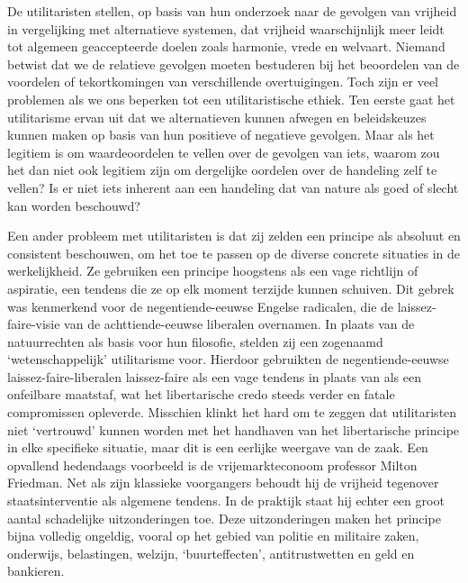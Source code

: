 \documentclass[
  a5paper,
  smalldemyvopaper,10pt,twoside,onecolumn,openright,extrafontsizes,hidelinks]{memoir}
\begin{document}
De utilitaristen stellen, op basis van hun onderzoek naar de gevolgen
van vrijheid in vergelijking met alternatieve systemen, dat vrijheid
waarschijnlijk meer leidt tot algemeen geaccepteerde doelen zoals
harmonie, vrede en welvaart. Niemand betwist dat we de relatieve
gevolgen moeten bestuderen bij het beoordelen van de voordelen of
tekortkomingen van verschillende overtuigingen. Toch zijn er veel
problemen als we ons beperken tot een utilitaristische ethiek. Ten
eerste gaat het utilitarisme ervan uit dat we alternatieven kunnen
afwegen en beleidskeuzes kunnen maken op basis van hun positieve of
negatieve gevolgen. Maar als het legitiem is om waardeoordelen te vellen
over de gevolgen van iets, waarom zou het dan niet ook legitiem zijn om
dergelijke oordelen over de handeling zelf te vellen? Is er niet iets
inherent aan een handeling dat van nature als goed of slecht kan worden
beschouwd?

Een ander probleem met utilitaristen is dat zij zelden een principe als
absoluut en consistent beschouwen, om het toe te passen op de diverse
concrete situaties in de werkelijkheid. Ze gebruiken een principe
hoogstens als een vage richtlijn of aspiratie, een tendens die ze op elk
moment terzijde kunnen schuiven. Dit gebrek was kenmerkend voor de
negentiende-eeuwse Engelse radicalen, die de laissez-faire-visie van de
achttiende-eeuwse liberalen overnamen. In plaats van de natuurrechten
als basis voor hun filosofie, stelden zij een zogenaamd
`wetenschappelijk' utilitarisme voor. Hierdoor gebruikten de
negentiende-eeuwse laissez-faire-liberalen laissez-faire als een vage
tendens in plaats van als een onfeilbare maatstaf, wat het libertarische
credo steeds verder en fatale compromissen opleverde. Misschien klinkt
het hard om te zeggen dat utilitaristen niet `vertrouwd' kunnen worden
met het handhaven van het libertarische principe in elke specifieke
situatie, maar dit is een eerlijke weergave van de zaak. Een opvallend
hedendaags voorbeeld is de vrijemarkteconoom professor Milton Friedman.
Net als zijn klassieke voorgangers behoudt hij de vrijheid tegenover
staatsinterventie als algemene tendens. In de praktijk staat hij echter
een groot aantal schadelijke uitzonderingen toe. Deze uitzonderingen
maken het principe bijna volledig ongeldig, vooral op het gebied van
politie en militaire zaken, onderwijs, belastingen, welzijn,
`buurteffecten', antitrustwetten en geld en bankieren.
\end{document}
